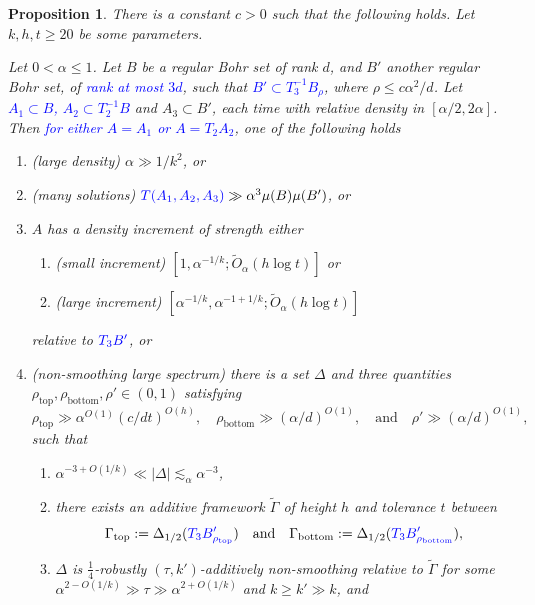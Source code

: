 \documentclass{daj}
\newtheorem{proposition}[theorem]{Proposition}
\theoremstyle{definition}
\newcommand{\leqs}[1]{\lesssim_{#1}}
\newcommand{\blue}[1]{\textcolor{blue}{#1}}
\begin{document}
\begin{proposition}
\label{prop:incrementOrANS}
There is a constant $c>0$ such that the following holds. Let $k, h, t\geq 20$ be some parameters. 

Let $0< \alpha\leq 1$. Let $B$ be a regular Bohr set of rank $d$, and $B'$ another regular Bohr set, of \blue{rank at most $3d$}, such that \blue{$B' \subset T_3^{-1}B_{\rho}$}, where $\rho \leq c\alpha^2/d$. Let \blue{$A_1 \subset B$, $A_2 \subset T_2^{-1}B$} and $A_3 \subset B'$, each time with relative density in $[\alpha/2, 2\alpha]$. Then \blue{for either $A = A_1$ or $A = T_2A_2$}, one of the following holds 
\begin{enumerate}
	\item (large density) $\alpha \gg 1/k^2$, or
	\item (many solutions) $\blue{T(A_1, A_2, A_3)} \gg \alpha^3 \mu(B) \mu(B')$, or
	\item $A$ has a density increment of strength either 
	\begin{enumerate}
		\item (small increment) $[1, \alpha^{-1/k}; \tilde{O}_{\alpha}(h \log t)]$ or 
		\item (large increment) $[\alpha^{-1/k}, \alpha^{-1+1/k}; \tilde{O}_{\alpha}(h \log t)]$
	\end{enumerate}
	relative to $\blue{T_3B'}$, or
	\item (non-smoothing large spectrum) there is a set $\Delta$ and three quantities ${\rho_{\mathrm{top}}, \rho_{\mathrm{bottom}}, \rho'\in (0, 1)}$ satisfying
	\begin{equation*}
	\rho_{\mathrm{top}} \gg \alpha^{O(1)}(c/dt)^{O(h)}, \quad \rho_{\mathrm{bottom}}\gg (\alpha/d)^{O(1)}, \quad \text{and}\quad \rho' \gg (\alpha/d)^{O(1)},
	\end{equation*}
	such that 
	\begin{enumerate}
		\item $\alpha^{-3 + O(1/k)} \ll |\Delta| \leqs{\alpha} \alpha^{-3}$,
		\item there exists an additive framework $\tilde{\Gamma}$ of height $h$ and tolerance $t$ between 
		\begin{equation*}
		\Gamma_{\mathrm{top}} := \Delta_{1/2}(\blue{T_3 B_{\rho_{\mathrm{top}}}'})\quad \text{and}\quad\Gamma_{\mathrm{bottom}} := \Delta_{1/2}(\blue{T_3 B_{\rho_{\mathrm{bottom}}}'}),
		\end{equation*}
		\item $\Delta$ is $\tfrac{1}{4}$-robustly $(\tau, k')$-additively non-smoothing relative to $\tilde{\Gamma}$ for some $\alpha^{2-O(1/k)} \gg \tau \gg \alpha^{2+O(1/k)}$ and $k\geq k' \gg k$, and 

\end{enumerate}
\end{enumerate}
\end{proposition}
\end{document}
